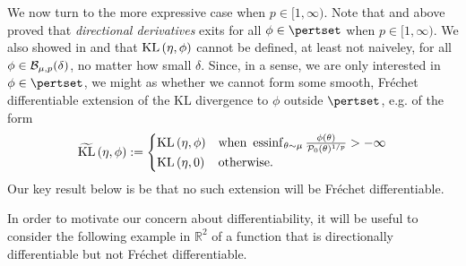 We now turn to the more expressive case when $p \in [1, \infty)$. Note that
 and  above proved that {\em
directional derivatives} exits for all $\phi \in \pertset$ when $p \in [1,
\infty)$.  We also showed in  and 
that $\mathrm{KL}\left(\eta, \phi\right)$ cannot be defined, at least not naiveley, for all $\phi
\in \mathcal{B}_{\mu,p}(\delta)$, no matter how small $\delta$. Since, in a sense, we
are only interested in $\phi \in \pertset$, we might as whether we cannot form
some smooth, Fr{\'e}chet differentiable extension of the KL divergence to $\phi$
outside $\pertset$, e.g. of the form
%
\begin{align*}
%
\KLhat{\eta, \phi} :=
\begin{cases}
    \KL{\eta, \phi} & \textrm{when }\essinf_{\theta \sim \mu}
        \frac{\phi(\theta)}{\pbase(\theta)^{1/p}} > -\infty\\
    \KL{\eta, \phiz} & \textrm{otherwise}.
\end{cases}
%
\end{align*}
%
Our key result below is be that no such extension will be Fr{\'e}chet
differentiable.

In order to motivate our concern about differentiability, it will be useful to
consider the following example in $\mathbb{R}^2$ of a function that is
directionally differentiable but not Fr{\'e}chet differentiable.

